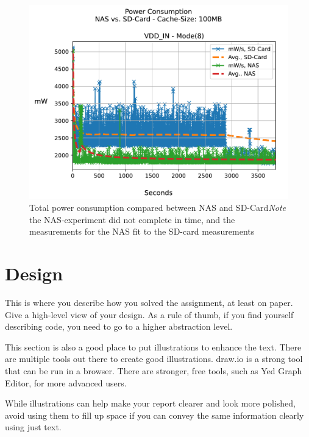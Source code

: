 \documentclass[conference]{IEEEtran}
\begin{document}
\begin{figure}[htbp]
	\begin{center}
		\includegraphics[width=\linewidth]{figures/NVSD_VDD_IN.pdf}
		\caption{Total power consumption compared between NAS and SD-Card\newline \emph{Note} the NAS-experiment did not complete in time, and the measurements for the NAS fit to the SD-card measurements}
		\label{fig:local_nas_sd_compare_pdf}
	\end{center}
\end{figure}

\section{Design}
\label{Section:Design}
This is where you describe how you solved the assignment, at least on paper. Give a high-level view of your design.
As a rule of thumb, if you find yourself describing code, you need to go to a higher abstraction level.


\bigskip

This section is also a good place to put illustrations to enhance the text.
There are multiple tools out there to create good illustrations.
draw.io is a strong tool that can be run in a browser. There are stronger, free tools, such as Yed Graph Editor, for more advanced users.


\bigskip

While illustrations can help make your report clearer and look more polished, avoid using them to fill up space if you can convey the same information clearly using just text.
\end{document}
